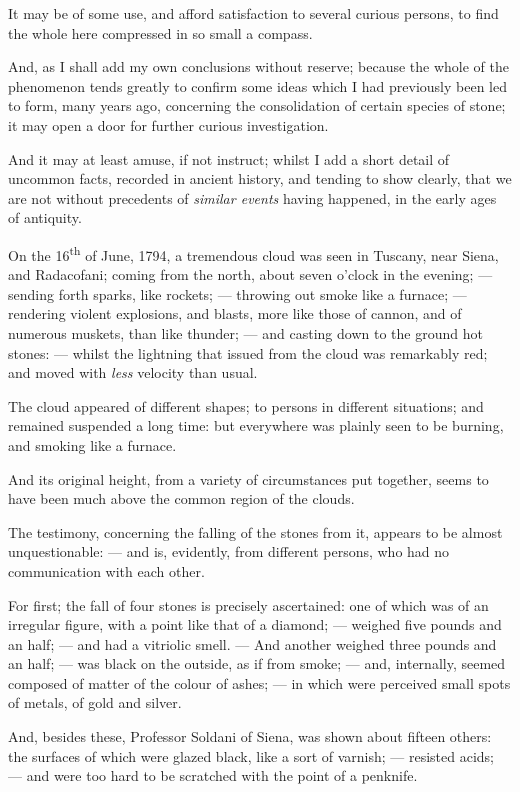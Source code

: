 \documentclass[a4paper, 12pt, oneside]{article}
\begin{document}
It may be of some use, and afford satisfaction to several curious persons, to find the whole here compressed in so small a compass.

And, as I shall add my own conclusions without reserve; because the whole of the phenomenon tends greatly to confirm some ideas which I had previously been led to form, many years ago, concerning the consolidation of certain species of stone; it may open a door for further curious investigation.

And it may at least amuse, if not instruct; whilst I add a short detail of uncommon facts, recorded in ancient history, and tending to show clearly, that we are not without precedents of \emph{similar events} having happened, in the early ages of antiquity.

On the 16\textsuperscript{th} of June, 1794, a tremendous cloud was seen in Tuscany, near Siena, and Radacofani; coming from the north, about seven o'clock in the evening; --- sending forth sparks, like rockets; --- throwing out smoke like a furnace; --- rendering violent explosions, and blasts, more like those of cannon, and of numerous muskets, than like thunder; --- and casting down to the ground hot stones: --- whilst the lightning that issued from the cloud was remarkably red; and moved with \emph{less} velocity than usual.

The cloud appeared of different shapes; to persons in different situations; and remained suspended a long time: but everywhere was plainly seen to be burning, and smoking like a furnace.

And its original height, from a variety of circumstances put together, seems to have been much above the common region of the clouds.

The testimony, concerning the falling of the stones from it, appears to be almost unquestionable: --- and is, evidently, from different persons, who had no communication with each other.

For first; the fall of four stones is precisely ascertained: one of which was of an irregular figure, with a point like that of a diamond; --- weighed five pounds and an half; --- and had a vitriolic smell. --- And another weighed three pounds and an half; --- was black on the outside, as if from smoke; --- and, internally, seemed composed of matter of the colour of ashes; --- in which were perceived small spots of metals, of gold and silver.

And, besides these, Professor Soldani of Siena, was shown about fifteen others: the surfaces of which were glazed black, like a sort of varnish; --- resisted acids; --- and were too hard to be scratched with the point of a penknife.
\end{document}
